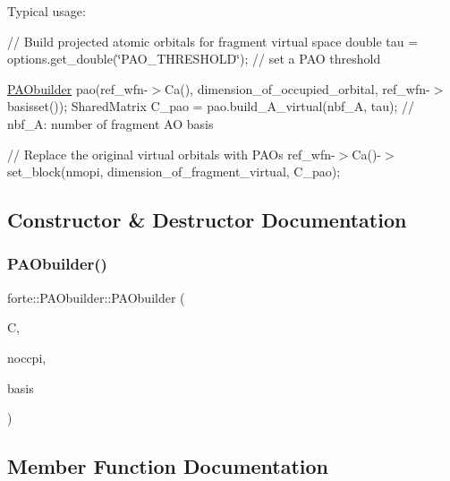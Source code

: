Typical usage\+:

// Build projected atomic orbitals for fragment virtual space double tau = options.\+get\+\_\+double(\char`\"{}\+P\+A\+O\+\_\+\+T\+H\+R\+E\+S\+H\+O\+L\+D\char`\"{}); // set a P\+AO threshold

\mbox{\hyperlink{classforte_1_1_p_a_obuilder}{P\+A\+Obuilder}} pao(ref\+\_\+wfn-\/$>$Ca(), dimension\+\_\+of\+\_\+occupied\+\_\+orbital, ref\+\_\+wfn-\/$>$basisset()); Shared\+Matrix C\+\_\+pao = pao.\+build\+\_\+\+A\+\_\+virtual(nbf\+\_\+\+A, tau); // nbf\+\_\+A\+: number of fragment AO basis

// Replace the original virtual orbitals with P\+A\+Os ref\+\_\+wfn-\/$>$Ca()-\/$>$set\+\_\+block(nmopi, dimension\+\_\+of\+\_\+fragment\+\_\+virtual, C\+\_\+pao); 

\subsection{Constructor \& Destructor Documentation}
\mbox{\label{classforte_1_1_p_a_obuilder_a969c35cc76f3cd82e92b863cf24bf666}} 
\subsubsection{\texorpdfstring{P\+A\+Obuilder()}{PAObuilder()}}
{\footnotesize\ttfamily forte\+::\+P\+A\+Obuilder\+::\+P\+A\+Obuilder (\begin{DoxyParamCaption}\item[{psi\+::\+Shared\+Matrix}]{C,  }\item[{psi\+::\+Dimension}]{noccpi,  }\item[{std\+::shared\+\_\+ptr$<$ psi\+::\+Basis\+Set $>$}]{basis }\end{DoxyParamCaption})}



\subsection{Member Function Documentation}
\mbox{\label{classforte_1_1_p_a_obuilder_a00baa0b6dad033c7e05be344077e3982}} 
